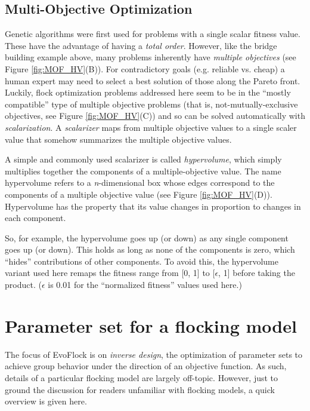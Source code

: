 \documentclass[letterpaper]{article}
\begin{document}
\subsection{Multi-Objective Optimization}
\label{subsec:Multi-Objective}

Genetic algorithms were first used for problems with a single scalar fitness value. These have the advantage of having a \textit{total order}. However, like the bridge building example above, many problems inherently have \textit{multiple objectives} (see Figure \ref{fig:MOF_HV}(B)). For contradictory goals (e.g. reliable vs. cheap) a human expert may need to select a best solution of those along the Pareto front. Luckily, flock optimization problems addressed here seem to be in the ``mostly compatible'' type of multiple objective problems (that is, not-mutually-exclusive objectives, see Figure \ref{fig:MOF_HV}(C)) and so can be solved automatically with \textit{scalarization}. A \textit{scalarizer} maps from multiple objective values to a single scaler value that somehow summarizes the multiple objective values.

A simple and commonly used scalarizer is called \textit{hypervolume}, which simply multiplies together the components of a multiple-objective value. The name hypervolume refers to a \textit{n}-dimensional box whose edges correspond to the components of a multiple objective value (see Figure \ref{fig:MOF_HV}(D)). Hypervolume has the property that its value changes in proportion to changes in each component.

So, for example, the hypervolume goes up (or down) as any single component goes up (or down). This holds as long as none of the components is zero, which ``hides'' contributions of other components. To avoid this, the hypervolume variant used here remaps the fitness range from [0, 1] to [$\epsilon$, 1] before taking the product. ($\epsilon$ is 0.01 for the ``normalized fitness'' values used here.)

\section{Parameter set for a flocking model}
\label{sec:parameter_set}

The focus of EvoFlock is on \textit{inverse design}, the optimization of parameter sets to achieve group behavior under the direction of an objective function. As such, details of a particular flocking model are largely off-topic. However, just to ground the discussion for readers unfamiliar with flocking models, a quick overview is given here.
\end{document}
